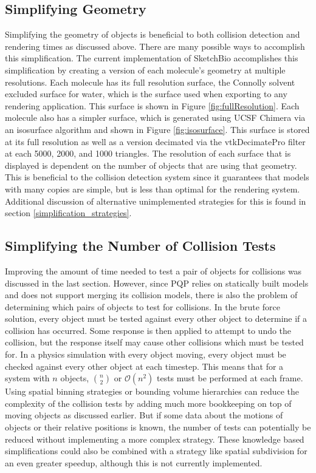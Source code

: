 \documentclass{article} %
\begin{document}
\subsection{Simplifying Geometry}
Simplifying the geometry of objects is beneficial to both collision detection and rendering times as discussed above.  There are many possible ways to accomplish this simplification.  The current implementation of SketchBio accomplishes this simplification by creating a version of each molecule's geometry at multiple resolutions. Each molecule has its full resolution surface, the Connolly solvent excluded surface for water, which is the surface used when exporting to any rendering application. This surface is shown in Figure \ref{fig:fullResolution}. Each molecule also has a simpler surface, which is generated using UCSF Chimera via an isosurface algorithm and shown in Figure \ref{fig:isosurface}. This surface is stored at its full resolution as well as a version decimated via the vtkDecimatePro filter at each 5000, 2000, and 1000 triangles.  The resolution of each surface that is displayed is dependent on the number of objects that are using that geometry.  This is beneficial to the collision detection system since it guarantees that models with many copies are simple, but is less than optimal for the rendering system.  Additional discussion of alternative unimplemented strategies for this is found in section \ref{simplification_strategies}.

\subsection{Simplifying the Number of Collision Tests}
Improving the amount of time needed to test a pair of objects for collisions was discussed in the last section.  However, since PQP relies on statically built models and does not support merging its collision models, there is also the problem of determining which pairs of objects to test for collisions.  In the brute force solution, every object must be tested against every other object to determine if a collision has occurred.  Some response is then applied to attempt to undo the collision, but the response itself may cause other collisions which must be tested for. In a physics simulation with every object moving, every object must be checked against every other object at each timestep. This means that for a system with $n$ objects, ${n \choose 2}$ or $\mathcal{O}(n^2)$ tests must be performed at each frame.  Using spatial binning strategies or bounding volume hierarchies can reduce the complexity of the collision tests by adding much more bookkeeping on top of moving objects as discussed earlier.  But if some data about the motions of objects or their relative positions is known, the number of tests can potentially be reduced without implementing a more complex strategy.  These knowledge based simplifications could also be combined with a strategy like spatial subdivision for an even greater speedup, although this is not currently implemented.
\end{document}
